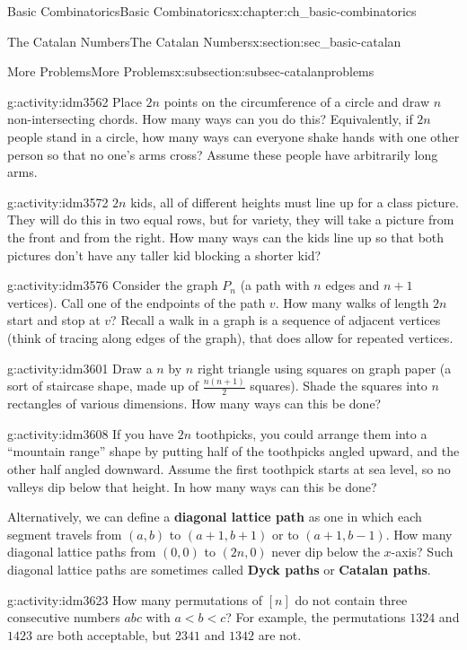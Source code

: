 \documentclass[oneside,10pt,]{book}
\newcommand{\terminology}[1]{\textbf{#1}}
\numberwithin{equation}{chapter}
\newcommand{\lt}{<}
\begin{document}
\begin{chapterptx}{Basic Combinatorics}{}{Basic Combinatorics}{}{}{x:chapter:ch_basic-combinatorics}
\begin{sectionptx}{The Catalan Numbers}{}{The Catalan Numbers}{}{}{x:section:sec_basic-catalan}
\begin{subsectionptx}{More Problems}{}{More Problems}{}{}{x:subsection:subsec-catalanproblems}
\begin{activity}{}{g:activity:idm3562}
Place \(2n\) points on the circumference of a circle and draw \(n\)  non-intersecting chords.  How many ways can you do this?  Equivalently, if \(2n\) people stand in a circle, how many ways can everyone shake hands with one other person so that no one's arms cross?  Assume these people have arbitrarily long arms.%
\end{activity}
\begin{activity}{}{g:activity:idm3572}%
\(2n\) kids, all of different heights must line up for a class picture.  They will do this in two equal rows, but for variety, they will take a picture from the front and from the right.  How many ways can the kids line up so that both pictures don't have any taller kid blocking a shorter kid?%
\end{activity}
\begin{activity}{}{g:activity:idm3576}%
Consider the graph \(P_n\) (a path with \(n\) edges and \(n+1\) vertices).  Call one of the endpoints of the path \(v\).  How many walks of length \(2n\) start and stop at \(v\)?  Recall a walk in a graph is a sequence of adjacent vertices (think of tracing along edges of the graph), that does allow for repeated vertices.%
\end{activity}
\begin{activity}{}{g:activity:idm3601}%
Draw a \(n\) by \(n\) right triangle using squares on graph paper (a sort of staircase shape, made up of \(\frac{n(n+1)}{2}\) squares).  Shade the squares into \(n\) rectangles of various dimensions.  How many ways can this be done?%
\end{activity}
\begin{activity}{}{g:activity:idm3608}%
If you have \(2n\) toothpicks, you could arrange them into a ``mountain range'' shape by putting half of the toothpicks angled upward, and the other half angled downward.  Assume the first toothpick starts at sea level, so no valleys dip below that height. In how many ways can this be done?%
\par
Alternatively, we can define a \terminology{diagonal lattice path} as one in which each segment travels from \((a,b)\) to \((a+1, b+1)\) or to \((a+1, b-1)\).  How many diagonal lattice paths from \((0,0)\) to \((2n,0)\) never dip below the \(x\)-axis?  Such diagonal lattice paths are sometimes called \terminology{Dyck paths} or \terminology{Catalan paths}.%
\end{activity}
\begin{activity}{}{g:activity:idm3623}%
How many permutations of \([n]\) do not contain three consecutive numbers \(abc\) with \(a \lt b \lt c\)?  For example, the permutations \(1324\) and \(1423\) are both acceptable, but \(2341\) and \(1342\) are not.%
\end{activity}
\end{subsectionptx}
\end{sectionptx}
\end{chapterptx}
\end{document}

